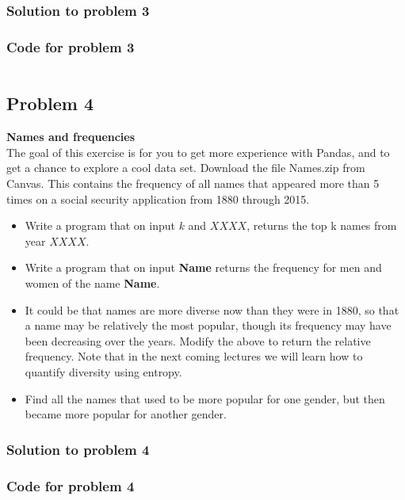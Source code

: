 \documentclass[12pt]{article}%
\begin{document}
\subsubsection{Solution to problem 3}



\subsubsection{Code for problem 3}
\begin{lstlisting}

\end{lstlisting}



\subsection{Problem 4}

\textbf{Names and frequencies}\\

The goal of this exercise is for you to get more experience with Pandas, and to get a chance to explore a cool data set. Download the file Names.zip from Canvas. This contains the frequency of all names that appeared more than 5 times on a social security application from 1880 through 2015.

\begin{itemize}
    \item Write a program that on input $k$ and $XXXX$, returns the top k names from year $XXXX$.
    \item Write a program that on input \textbf{Name} returns the frequency for men and women of the name \textbf{Name}.
    \item It could be that names are more diverse now than they were in 1880, so that a name may be relatively the most popular, though its frequency may have been decreasing over the years. Modify the above to return the relative frequency. Note that in the next coming lectures we will learn how to quantify diversity using entropy.
    \item Find all the names that used to be more popular for one gender, but then became more popular for another gender.
\end{itemize}

\subsubsection{Solution to problem 4}



\subsubsection{Code for problem 4}
\begin{lstlisting}

\end{lstlisting}

\end{document}
